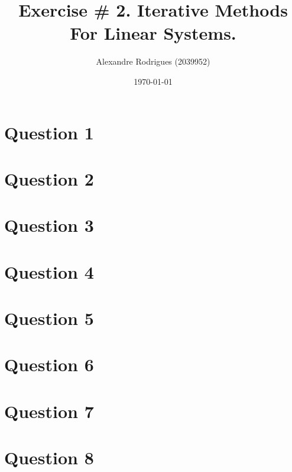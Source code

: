 \documentclass[a4paper, 11pt]{article}
\begin{document}
	
	\title{Exercise \# 2. Iterative Methods For Linear Systems. }
	\author{{\small Alexandre Rodrigues (2039952)}}
	\date{\today}
	
	\maketitle
		\section*{Question 1}
		
		
		\section*{Question 2}
		
		
		\section*{Question 3}
		
		
		\section*{Question 4}		
		
		
		\section*{Question 5}
		
		
		\section*{Question 6}
		
		
		\section*{Question 7}
		
		
		\section*{Question 8}
	
	
	
\end{document}
